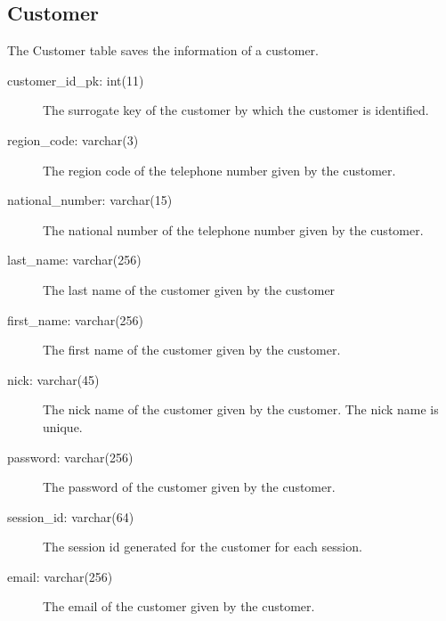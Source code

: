    \subsection{Customer}
    The Customer table saves the information of a customer.
    \begin{description}
        \item[customer\_id\_pk: int(11)] The surrogate key of the customer by which the customer is identified.
        \item[region\_code: varchar(3)] The region code of the telephone number given by the customer.
        \item[national\_number: varchar(15)] The national number of the telephone number given by the customer.
        \item[last\_name: varchar(256)] The last name of the customer given by the customer
        \item[first\_name: varchar(256)] The first name of the customer given by the customer.
        \item[nick: varchar(45)] The nick name of the customer given by the customer. The nick name is unique.
        \item[password: varchar(256)] The password of the customer given by the customer.
        \item[session\_id: varchar(64)] The session id generated for the customer for each session.
        \item[email: varchar(256)] The email of the customer given by the customer.
    \end{description}


